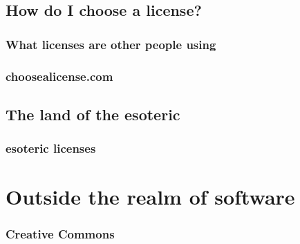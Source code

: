 \documentclass{beamer}
\begin{document}
	\subsection{How do I choose a license?}
	\begin{frame}
		\frametitle{What licenses are other people using}
	\end{frame}
	\begin{frame}
		\frametitle{choosealicense.com}
	\end{frame}
	\subsection{The land of the esoteric}
	\begin{frame}
		\frametitle{esoteric licenses}
	\end{frame}
	\section{Outside the realm of software}
	\begin{frame}
		\frametitle{Creative Commons}
	\end{frame}
\end{document}
